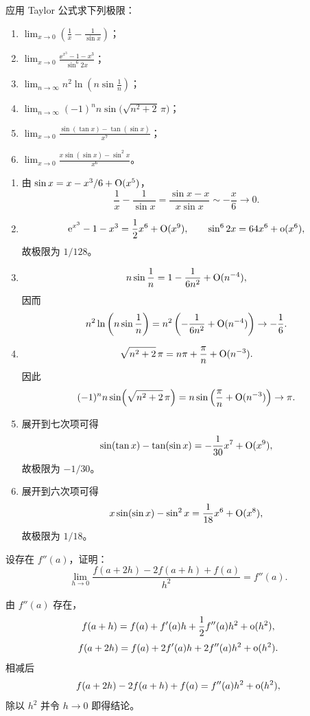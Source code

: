 \begin{xexercise}[4]
应用 Taylor 公式求下列极限：
  \begin{enumerate}[label=(\arabic*)]
    \item $\displaystyle\lim_{x\to0}\left(\frac1x-\frac1{\sin x}\right)$；
    \item $\displaystyle\lim_{x\to0}\frac{\ee^{x^3}-1-x^3}{\sin^6 2x}$；
    \item $\displaystyle\lim_{n\to\infty}n^2\ln\left(n\sin\frac1n\right)$；
    \item $\displaystyle\lim_{n\to\infty}(-1)^n n\sin\bigl(\sqrt{n^2+2}\,\pi\bigr)$；
    \item $\displaystyle\lim_{x\to0}\frac{\sin(\tan x)-\tan(\sin x)}{x^7}$；
    \item $\displaystyle\lim_{x\to0}\frac{x\sin(\sin x)-\sin^2x}{x^6}$。
  \end{enumerate}
\end{xexercise}
\begin{xsolution}
\begin{enumerate}[label=(\arabic*)]
  \item 由 $\sin x=x-x^3/6+\mathrm{O}(x^5)$，
  \[
    \frac1x-\frac1{\sin x}
    =\frac{\sin x-x}{x\sin x}\sim-\frac x6\to0.
  \]

  \item
  \[
    \mathrm{e}^{x^3}-1-x^3=\frac12x^6+\mathrm{O}(x^9),\qquad
    \sin^6 2x=64x^6+\mathrm{o}(x^6),
  \]
  故极限为 $1/128$。

  \item
  \[
    n\sin\frac1n=1-\frac1{6n^2}+\mathrm{O}(n^{-4}),
  \]
  因而
  \[
    n^2\ln\left(n\sin\frac1n\right)
    =n^2\left(-\frac1{6n^2}+\mathrm{O}(n^{-4})\right)\to-\frac16.
  \]

  \item
  \[
    \sqrt{n^2+2}\,\pi
    =n\pi+\frac\pi n+\mathrm{O}(n^{-3}).
  \]
  因此
  \[
    (-1)^n n\sin(\sqrt{n^2+2}\,\pi)
    =n\sin\left(\frac\pi n+\mathrm{O}(n^{-3})\right)\to\pi.
  \]

  \item 展开到七次项可得
  \[
    \sin(\tan x)-\tan(\sin x)=-\frac1{30}x^7+\mathrm{O}(x^9),
  \]
  故极限为 $-1/30$。

  \item 展开到六次项可得
  \[
    x\sin(\sin x)-\sin^2x=\frac1{18}x^6+\mathrm{O}(x^8),
  \]
  故极限为 $1/18$。
\end{enumerate}
\end{xsolution}


\begin{xexercise}[5]
设存在 $f''(a)$，证明：
  \[
    \lim_{h\to0}\frac{f(a+2h)-2f(a+h)+f(a)}{h^2}=f''(a).
  \]
\end{xexercise}
\begin{xsolution}
由 $f''(a)$ 存在，
\[
  f(a+h)=f(a)+f'(a)h+\frac12f''(a)h^2+\mathrm{o}(h^2),
\]
\[
  f(a+2h)=f(a)+2f'(a)h+2f''(a)h^2+\mathrm{o}(h^2).
\]
相减后
\[
  f(a+2h)-2f(a+h)+f(a)=f''(a)h^2+\mathrm{o}(h^2),
\]
除以 $h^2$ 并令 $h\to0$ 即得结论。
\end{xsolution}


